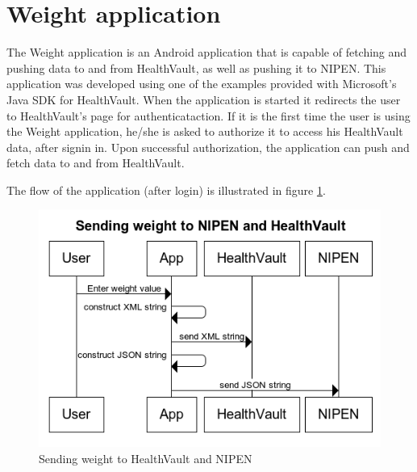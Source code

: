 \section{Weight application}

The Weight application is an Android application that is capable of fetching and pushing data
to and from HealthVault, as well as pushing it to NIPEN. This application was developed using one of the examples
provided with Microsoft's Java SDK for HealthVault\cite{HealthVaultSDK}.
When the application is started it redirects the user to HealthVault's page for authenticataction.
If it is the first time the user is using the Weight application, he/she is asked to authorize it to access
his HealthVault data, after signin in. Upon successful authorization, the application can push and fetch data
to and from HealthVault.

The flow of the application (after login) is illustrated in figure \ref{figure:sending-weight-to-healthvault-and-nipen}.

\begin{figure}[h]
\centering
\includegraphics[scale=1.0]{../Figures/sending-weight-to-healthvault-and-nipen.png}
\caption{Sending weight to HealthVault and NIPEN}
\label{figure:sending-weight-to-healthvault-and-nipen}
\end{figure}

